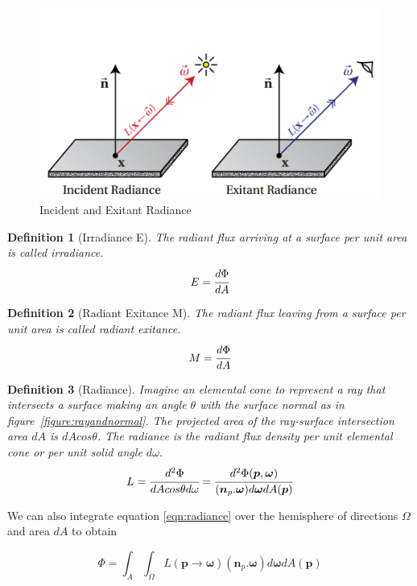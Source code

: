 \documentclass[a4paper, 12pt]{article}
\newtheorem{definition}{Definition}
\begin{document}
\begin{center}
\begin{figure}
	\includegraphics[width=0.8\linewidth, scale=0.6]{incidentradiance.png}
	\centering
	\caption{Incident and Exitant Radiance}
	\label{figure:incidentexitant}
\end{figure}
\end{center}

\begin{definition}[Irradiance E]
	The radiant flux arriving at a surface per unit area 
	is called irradiance. 
	$$
		E = \cfrac{d\Phi}{dA}
	$$
\end{definition}

\begin{definition}[Radiant Exitance M]
	The radiant flux leaving from a surface per unit area 
	is called radiant exitance. 
	$$
		M =  \cfrac{d\Phi}{dA}
	$$
\end{definition}


\begin{definition}[Radiance]
	Imagine an elemental cone to represent a 
	ray that intersects a surface making an 
	angle $\theta$ with the surface normal as in figure~\ref{figure:rayandnormal}.
	The projected area of the ray-surface intersection area $dA$
	is $dAcos\theta$. The radiance is the radiant flux 
	density per unit elemental cone or per unit solid 
	angle $d\omega$. 
	\begin{equation}\label{eqn:radiance}
		L = \cfrac{d^{2} \Phi}{dA cos\theta d\omega} = \cfrac{d^{2}\Phi(\bm{p}, \bm{\omega})}{(\bm{n}_{p}.\bm{\omega})d\bm{\omega}dA(\bm{p})}
	\end{equation}
\end{definition}

We can also integrate equation \eqref{eqn:radiance} over the hemisphere of directions $\Omega$
and area $dA$ to obtain 

$$
\Phi = \int_{A}\int_{\Omega}L(\bm{p}\to \bm{\omega})(\bm{n}_{p}.\bm{\omega})d\bm{\omega}dA(\bm{p})
$$
\end{document}
